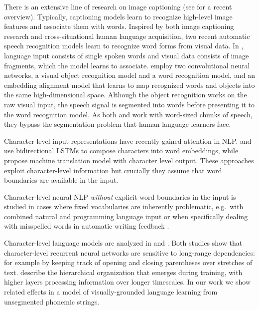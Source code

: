 There is an extensive line of research on image captioning (see  for a recent overview). Typically, captioning models learn to recognize high-level image features and associate them with words. Inspired by both image captioning research and cross-situational human language acquisition, two recent automatic speech recognition models learn to recognize word forms from visual data. In , language input consists of single spoken words and visual data consists of image fragments, which the model learns to associate.  employ two convolutional neural networks, a visual object recognition model and a word recognition model, and an embedding alignment model that learns to map recognized words and objects into the same high-dimensional space. Although the object recognition works on the raw visual input, the speech signal is segmented into words before presenting it to the word recognition model. As both  and  work with word-sized chunks of speech, they bypass the segmentation problem that human language learners face.

Character-level input representations have recently gained attention
in NLP.  and
 use bidirectional LSTMs to compose
characters into word embeddings, while
 propose machine translation model with 
character level output. These approaches exploit character-level
information but crucially they assume that word boundaries are available
in the input.

Character-level neural NLP \textit{without} explicit word boundaries in the input is studied in cases where fixed vocabularies are inherently problematic, e.g.\ with combined natural and programming language input \cite{chrupala2013text} or when specifically dealing with misspelled words in automatic writing feedback \cite{xie2016neural}. 

Character-level language models are analyzed in
 and
. Both studies show that
character-level recurrent neural networks are sensitive to
long-range dependencies: for example by keeping track of opening and
closing parentheses over stretches of
text.  describe the hierarchical
organization that emerges during training, with higher layers
processing information over longer timescales. In our work we show
related effects in a model of visually-grounded
language learning from unsegmented phonemic strings.

